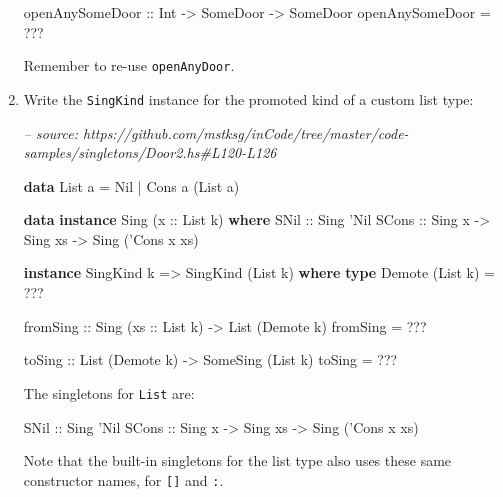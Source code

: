 \documentclass[]{article}
\newenvironment{Shaded}{}{}
\newcommand{\CharTok}[1]{\textcolor[rgb]{0.25,0.44,0.63}{#1}}
\newcommand{\CommentTok}[1]{\textcolor[rgb]{0.38,0.63,0.69}{\textit{#1}}}
\newcommand{\DataTypeTok}[1]{\textcolor[rgb]{0.56,0.13,0.00}{#1}}
\newcommand{\FunctionTok}[1]{\textcolor[rgb]{0.02,0.16,0.49}{#1}}
\newcommand{\KeywordTok}[1]{\textcolor[rgb]{0.00,0.44,0.13}{\textbf{#1}}}
\newcommand{\NormalTok}[1]{#1}
\newcommand{\OtherTok}[1]{\textcolor[rgb]{0.00,0.44,0.13}{#1}}
\begin{document}
\begin{enumerate}
\begin{Shaded}
\begin{Highlighting}[]
\OtherTok{openAnySomeDoor ::} \DataTypeTok{Int} \OtherTok{->} \DataTypeTok{SomeDoor} \OtherTok{->} \DataTypeTok{SomeDoor}
\NormalTok{openAnySomeDoor }\FunctionTok{=} \FunctionTok{???}
\end{Highlighting}
\end{Shaded}

  Remember to re-use \texttt{openAnyDoor}.
\item
  Write the \texttt{SingKind} instance for the promoted kind of a custom list
  type:

\begin{Shaded}
\begin{Highlighting}[]
\CommentTok{-- source: https://github.com/mstksg/inCode/tree/master/code-samples/singletons/Door2.hs#L120-L126}

\KeywordTok{data} \DataTypeTok{List}\NormalTok{ a }\FunctionTok{=} \DataTypeTok{Nil} \FunctionTok{|} \DataTypeTok{Cons}\NormalTok{ a (}\DataTypeTok{List}\NormalTok{ a)}

\KeywordTok{data} \KeywordTok{instance} \DataTypeTok{Sing}\NormalTok{ (}\OtherTok{x ::} \DataTypeTok{List}\NormalTok{ k) }\KeywordTok{where}
    \DataTypeTok{SNil}\OtherTok{  ::} \DataTypeTok{Sing} \CharTok{'Nil}
    \DataTypeTok{SCons}\OtherTok{ ::} \DataTypeTok{Sing}\NormalTok{ x }\OtherTok{->} \DataTypeTok{Sing}\NormalTok{ xs }\OtherTok{->} \DataTypeTok{Sing}\NormalTok{ (}\CharTok{'Cons x xs)}

\KeywordTok{instance} \DataTypeTok{SingKind}\NormalTok{ k }\OtherTok{=>} \DataTypeTok{SingKind}\NormalTok{ (}\DataTypeTok{List}\NormalTok{ k) }\KeywordTok{where}
    \KeywordTok{type} \DataTypeTok{Demote}\NormalTok{ (}\DataTypeTok{List}\NormalTok{ k) }\FunctionTok{=} \FunctionTok{???}

\OtherTok{    fromSing ::} \DataTypeTok{Sing}\NormalTok{ (}\OtherTok{xs ::} \DataTypeTok{List}\NormalTok{ k) }\OtherTok{->} \DataTypeTok{List}\NormalTok{ (}\DataTypeTok{Demote}\NormalTok{ k)}
\NormalTok{    fromSing }\FunctionTok{=} \FunctionTok{???}

\OtherTok{    toSing ::} \DataTypeTok{List}\NormalTok{ (}\DataTypeTok{Demote}\NormalTok{ k) }\OtherTok{->} \DataTypeTok{SomeSing}\NormalTok{ (}\DataTypeTok{List}\NormalTok{ k)}
\NormalTok{    toSing }\FunctionTok{=} \FunctionTok{???}
\end{Highlighting}
\end{Shaded}

  The singletons for \texttt{List} are:

\begin{Shaded}
\begin{Highlighting}[]
\DataTypeTok{SNil}\OtherTok{  ::} \DataTypeTok{Sing} \CharTok{'Nil}
\DataTypeTok{SCons}\OtherTok{ ::} \DataTypeTok{Sing}\NormalTok{ x }\OtherTok{->} \DataTypeTok{Sing}\NormalTok{ xs }\OtherTok{->} \DataTypeTok{Sing}\NormalTok{ (}\CharTok{'Cons x xs)}
\end{Highlighting}
\end{Shaded}

  Note that the built-in singletons for the list type also uses these same
  constructor names, for \texttt{{[}{]}} and \texttt{:}.
\end{enumerate}
\end{document}
